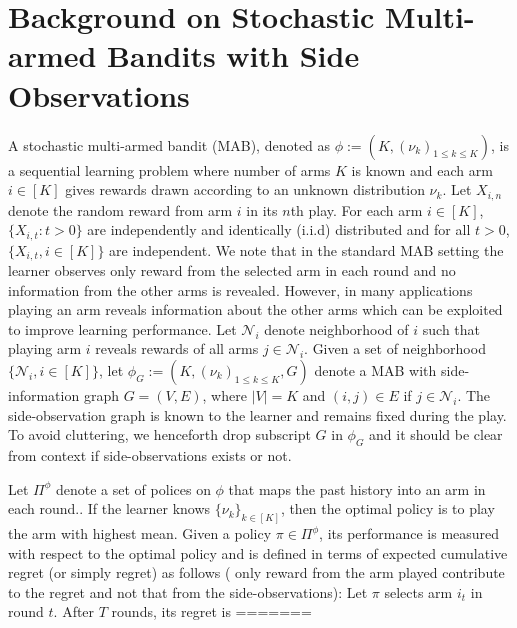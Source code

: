 \documentclass{article}
\begin{document}
\section{Background on Stochastic Multi-armed Bandits with Side Observations}
A stochastic multi-armed bandit (MAB), denoted as $\phi:=(K, (\nu_k)_{1 \leq k \leq K})$, is a sequential learning problem where number of arms $K$ is known and each arm $i \in [K]$ gives rewards drawn according to an unknown distribution $\nu_k$. Let $X_{i,n}$ denote the random reward from arm $i$ in its $n$th play. For each arm $i\in [K]$, $\{X_{i,t}: t>0\}$ are independently and identically (i.i.d) distributed and for all $t>0$, $\{X_{i,t}, i \in [K]\}$ are independent. We note that in the standard MAB setting the learner observes only reward from the selected arm in each round and no information from the other arms is revealed. However, in many applications playing an arm reveals information about the other arms which can be exploited to improve learning performance. Let $\mathcal{N}_i$  denote neighborhood of $i$ such that playing arm $i$ reveals rewards of all arms $j \in \mathcal{N}_i$.  Given a set of neighborhood $\{\mathcal{N}_i, i\in [K]\}$, let $\phi_G:=(K, (\nu_k)_{1\leq k\leq K}, G)$ denote a MAB with side-information graph $G=(V,E)$, where $|V|=K$ and $(i,j)\in E$ if $j \in \mathcal{N}_i$. The side-observation graph is known to the learner and remains fixed during the play. To avoid cluttering, we henceforth drop subscript $G$ in $\phi_G$ and it should be clear from context if side-observations exists or not. 

Let $\Pi^{\phi}$ denote a set of polices on $\phi$ that maps the past history into an arm in each round.. If the learner knows $\{\nu_k\}_{k \in [K]}$, then the optimal policy is to play the arm with highest mean. Given a policy $\pi \in \Pi^{\phi}$, its performance is measured with respect to the optimal policy and is defined in terms of expected cumulative regret (or simply regret) as follows ( only reward from the arm played contribute to the regret and not that from the side-observations):  Let $\pi$ selects arm $i_t$ in round $t$. After $T$ rounds, its regret is 
=======
\end{document}
